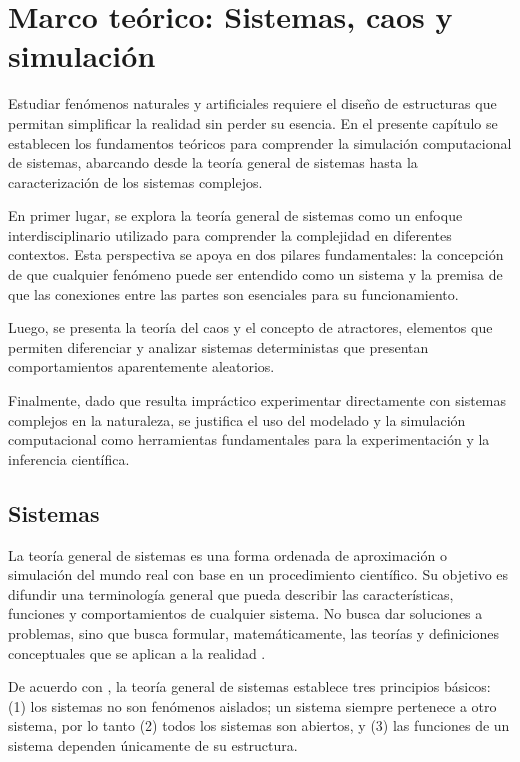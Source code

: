 \chapter{Marco teórico: Sistemas, caos y simulación}

Estudiar fenómenos naturales y artificiales requiere el diseño de estructuras que permitan simplificar la realidad sin perder su esencia.  En el presente capítulo se establecen los fundamentos teóricos para comprender la simulación computacional de sistemas, abarcando desde la teoría general de sistemas hasta la caracterización de los sistemas complejos.

En primer lugar, se explora la teoría general de sistemas como un enfoque interdisciplinario utilizado para comprender la complejidad en diferentes contextos. Esta perspectiva se apoya en dos pilares fundamentales: la concepción de que cualquier fenómeno puede ser entendido como un sistema y la premisa de que las conexiones entre las partes son esenciales para su funcionamiento.

Luego, se presenta la teoría del caos y el concepto de atractores, elementos que permiten diferenciar y analizar sistemas deterministas que presentan comportamientos aparentemente aleatorios.

Finalmente, dado que resulta impráctico experimentar directamente con sistemas complejos en la naturaleza, se justifica el uso del modelado y la simulación computacional como herramientas fundamentales para la experimentación y la inferencia científica.
	
\section{Sistemas}

La teoría general de sistemas es una forma ordenada de aproximación o simulación del mundo real con base en un procedimiento científico. Su objetivo es difundir una terminología general que pueda describir las características, funciones y comportamientos de cualquier sistema. No busca dar soluciones a problemas, sino que busca formular, matemáticamente, las teorías y definiciones conceptuales que se aplican a la realidad \cite{inei1999_def_tgs, Arnold1998_def_tgs}. 

De acuerdo con \cite{sanchez2024_principios, solano2019_principios, caraballo2013_principios}, la teoría general de sistemas establece tres principios básicos: (1) los sistemas no son fenómenos aislados; un sistema siempre pertenece a otro sistema, por lo tanto (2) todos los sistemas son abiertos, y (3) las funciones de un sistema dependen únicamente de su estructura.

